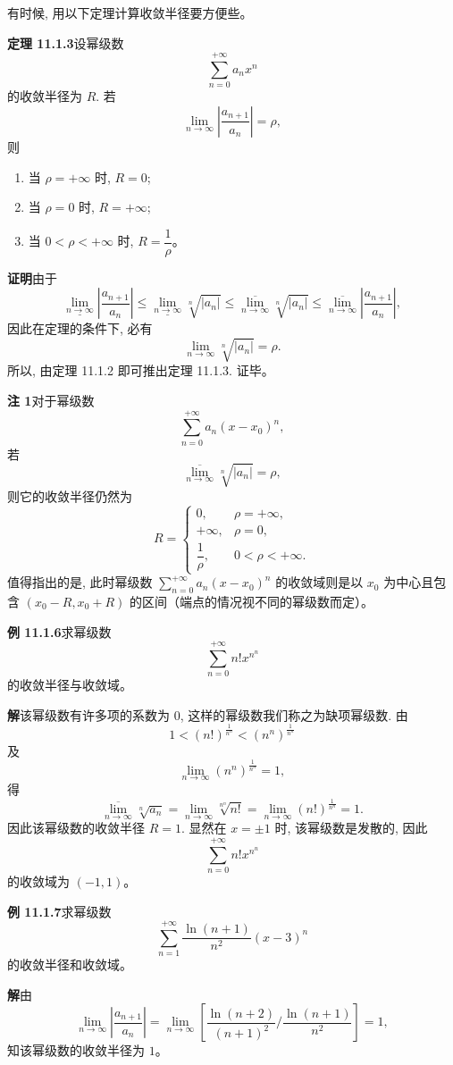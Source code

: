 \documentclass[UTF8, 12pt, fontset=fandol, oneside]{ctexart}
\begin{document}
有时候, 用以下定理计算收敛半径要方便些。

\noindent\textbf{定理 11.1.3}\quad 设幂级数
\[
  \sum_{n=0}^{+\infty}a_nx^n
\]
的收敛半径为 $R$. 若
\[
  \lim_{n\to\infty}\left|\frac{a_{n+1}}{a_n}\right|=\rho,
\]
则
\begin{enumerate}
  \item 当 $\rho=+\infty$ 时, $R=0$;
  \item 当 $\rho=0$ 时, $R=+\infty$;
  \item 当 $0<\rho<+\infty$ 时, $R=\dfrac1\rho$。
\end{enumerate}

\noindent\textbf{证明}\quad 由于
\[
  \underline{\lim_{n\to\infty}}\left|\frac{a_{n+1}}{a_n}\right|
  \leqslant
  \underline{\lim_{n\to\infty}}\sqrt[n]{|a_n|}
  \leqslant
  \overline{\lim_{n\to\infty}}\sqrt[n]{|a_n|}
  \leqslant
  \overline{\lim_{n\to\infty}}\left|\frac{a_{n+1}}{a_n}\right|,
\]
因此在定理的条件下, 必有
\[
  \lim_{n\to\infty}\sqrt[n]{|a_n|}=\rho.
\]
所以, 由定理 11.1.2 即可推出定理 11.1.3. 证毕。

\noindent\textbf{注 1}\quad 对于幂级数
\[
  \sum_{n=0}^{+\infty}a_n(x-x_0)^n,
\]
若
\[
  \overline{\lim_{n\to\infty}}\sqrt[n]{|a_n|}=\rho,
\]
则它的收敛半径仍然为
\[
  R=
  \begin{cases}
    0, & \rho=+\infty,\\
    +\infty, & \rho=0,\\
    \dfrac1\rho, & 0<\rho<+\infty.
  \end{cases}
\]
值得指出的是, 此时幂级数 $\sum_{n=0}^{+\infty}a_n(x-x_0)^n$ 的收敛域则是以 $x_0$ 为中心且包含 $(x_0-R,x_0+R)$ 的区间（端点的情况视不同的幂级数而定）。

\noindent\textbf{例 11.1.6}\quad 求幂级数
\[
  \sum_{n=0}^{+\infty}n!x^{n^n}
\]
的收敛半径与收敛域。

\noindent\textbf{解}\quad 该幂级数有许多项的系数为 $0$, 这样的幂级数我们称之为缺项幂级数. 由
\[
  1<(n!)^{\frac1{n^n}}<(n^n)^{\frac1{n^n}}
\]
及
\[
  \lim_{n\to\infty}(n^n)^{\frac1{n^n}}=1,
\]
得
\[
  \overline{\lim_{n\to\infty}}\sqrt[n]{a_n}
  =
  \lim_{n\to\infty}\sqrt[n^n]{n!}
  =
  \lim_{n\to\infty}(n!)^{\frac1{n^n}}
  =1.
\]
因此该幂级数的收敛半径 $R=1$. 显然在 $x=\pm1$ 时, 该幂级数是发散的, 因此
\[
  \sum_{n=0}^{+\infty}n!x^{n^n}
\]
的收敛域为 $(-1,1)$。

\noindent\textbf{例 11.1.7}\quad 求幂级数
\[
  \sum_{n=1}^{+\infty}\frac{\ln(n+1)}{n^2}(x-3)^n
\]
的收敛半径和收敛域。

\noindent\textbf{解}\quad 由
\[
  \lim_{n\to\infty}\left|\frac{a_{n+1}}{a_n}\right|
  =
  \lim_{n\to\infty}
  \left[
    \frac{\ln(n+2)}{(n+1)^2}\Big/\frac{\ln(n+1)}{n^2}
  \right]
  =1,
\]
知该幂级数的收敛半径为 $1$。
\end{document}
